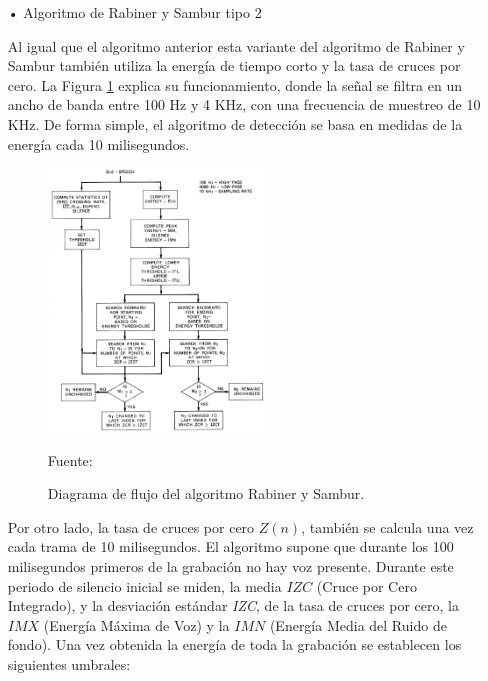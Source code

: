 \begin{enumerate}
\begin{enumerate}
\item[•]Algoritmo de Rabiner y Sambur tipo 2
\par
Al igual que el algoritmo anterior esta variante del algoritmo de Rabiner y Sambur también utiliza la energía de tiempo corto y la tasa de cruces por cero. La Figura \ref{fig:figura2.25} explica su funcionamiento, donde la señal se filtra en un ancho de banda entre 100 Hz y 4 KHz, con una frecuencia de muestreo de 10 KHz. De forma simple, el algoritmo de detección se basa en medidas de la energía cada 10 milisegundos.

\begin{figure}[ht]
\begin{center}
\includegraphics[width=0.55\textwidth]{Imagenes/Cap2/image026}
\end{center}
\begin{center}
\vskip -0.5cm
\caption{\small{Diagrama de flujo del algoritmo Rabiner y Sambur.}}
\label{fig:figura2.25}
{\small{Fuente: \cite{rabiner}}}
\end{center}
\end{figure}

Por otro lado, la tasa de cruces por cero $Z(n)$, también se calcula una vez cada trama de 10 milisegundos. El algoritmo supone que durante los 100 milisegundos primeros de la grabación no hay voz presente. Durante este periodo de silencio inicial se miden, la media $IZC$ (Cruce por Cero Integrado), y la desviación estándar \textit{IZC}, de la tasa de cruces por cero, la $IMX$ (Energía Máxima de Voz) y la $IMN$ (Energía Media del Ruido de fondo). Una vez obtenida la energía de toda la grabación se establecen los siguientes umbrales:


\end{enumerate}
\end{enumerate}

